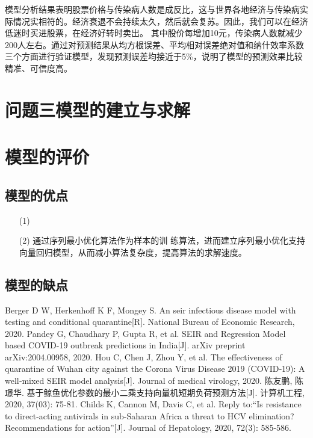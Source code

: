 \documentclass{whutmod}
\begin{document}
模型分析结果表明股票价格与传染病人数是成反比，这与世界各地经济与传染病实际情况实相符的。经济衰退不会持续太久，然后就会复苏。因此，我们可以在经济低迷时买进股票，在经济好转时卖出。 其中股价每增加10元，传染病人数就减少200人左右。通过对预测结果从均方根误差、平均相对误差绝对值和纳什效率系数三个方面进行验证模型，发现预测误差均接近于5\%，说明了模型的预测效果比较精准、可信度高。

	
    \section{问题三模型的建立与求解}

 
  	\section{模型的评价}
		\subsection{模型的优点}
			\begin{itemize}                                             
			\item [(1)]
			\item [(2)]通过序列最小优化算法作为样本的训 练算法，进而建立序列最小优化支持向量回归模型，从而减小算法复杂度，提高算法的求解速度。
			
				
			\end{itemize}
		\subsection{模型的缺点}

  
 
	\newpage	%
	\nocite{*}		%
	\begin{thebibliography}{9}%
		Berger D W, Herkenhoff K F, Mongey S. An seir infectious disease model with testing and conditional quarantine[R]. National Bureau of Economic Research, 2020.
	Pandey G, Chaudhary P, Gupta R, et al. SEIR and Regression Model based COVID-19 outbreak predictions in India[J]. arXiv preprint arXiv:2004.00958, 2020.
	Hou C, Chen J, Zhou Y, et al. The effectiveness of quarantine of Wuhan city against the Corona Virus Disease 2019 (COVID‐19): A well‐mixed SEIR model analysis[J]. Journal of medical virology, 2020.
	陈友鹏, 陈璟华. 基于鲸鱼优化参数的最小二乘支持向量机短期负荷预测方法[J]. 计算机工程, 2020, 37(03): 75-81.
	Childs K, Cannon M, Davis C, et al. Reply to:“Is resistance to direct-acting antivirals in sub-Saharan Africa a threat to HCV elimination? Recommendations for action”[J]. Journal of Hepatology, 2020, 72(3): 585-586.
	\end{thebibliography}
\end{document}
